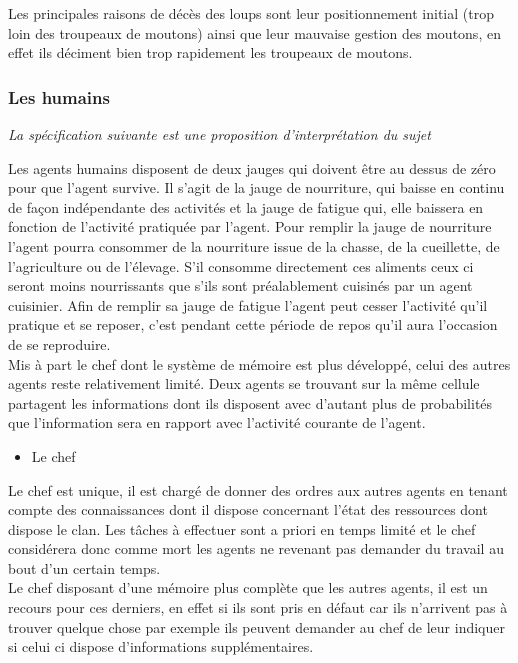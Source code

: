 \documentclass[12pt]{article}
\begin{document}
Les principales raisons de décès des loups sont leur positionnement initial 
(trop loin des troupeaux de moutons) ainsi que leur mauvaise gestion des 
moutons, en effet ils déciment bien trop rapidement les troupeaux de moutons.\\

		\subsubsection{Les humains}

\textit{La spécification suivante est une proposition d'interprétation du 
sujet\\}

Les agents humains disposent de deux jauges qui doivent être au dessus de 
zéro pour que l'agent survive. Il s'agit de la jauge de nourriture, qui baisse 
en continu de façon indépendante des activités et la jauge de fatigue qui, 
elle baissera en fonction de l'activité pratiquée par l'agent. Pour remplir 
la jauge de nourriture l'agent pourra consommer de la nourriture issue de la 
chasse, de la cueillette, de l'agriculture ou de l'élevage. S'il consomme 
directement ces aliments ceux ci seront moins nourrissants que s'ils sont 
préalablement cuisinés par un agent cuisinier. Afin de remplir sa jauge de 
fatigue l'agent peut cesser l'activité qu'il pratique et se reposer, c'est 
pendant cette période de repos qu'il aura l'occasion de se reproduire.\\

Mis à part le chef dont le système de mémoire est plus développé, celui des 
autres agents reste relativement limité. Deux agents se trouvant sur la même 
cellule partagent les informations dont ils disposent avec d'autant plus de 
probabilités que l'information sera en rapport avec l'activité courante de 
l'agent.

		\begin{itemize}
		\item Le chef\\
		\end{itemize}

Le chef est unique, il est chargé de donner des ordres aux autres agents en 
tenant compte des connaissances dont il dispose concernant l'état des 
ressources dont dispose le clan. Les tâches à effectuer sont a priori en temps 
limité et le chef considérera donc comme mort les agents ne revenant pas 
demander du travail au bout d'un certain temps.\\

Le chef disposant d'une mémoire plus complète que les autres agents, il est un 
recours pour ces derniers, en effet si ils sont pris en défaut car ils 
n'arrivent pas à trouver quelque chose par exemple ils peuvent demander au 
chef de leur indiquer si celui ci dispose d'informations supplémentaires.\\
\end{document}
